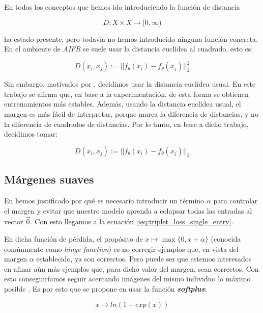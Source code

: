 En todos los conceptos que hemos ido introduciendo la función de distancia

\begin{equation}
    D: X \times X \to [0, \infty)
\end{equation}

ha estado presente, pero todavía no hemos introducido ninguna función concreta. En el ambiente de \textit{AIFR} se suele usar la distancia euclídea al cuadrado, esto es:

\begin{equation}
    D(x_i, x_j) := ||f_{\theta}(x_i) - f_{\theta}(x_j)||^2_2
\end{equation}

Sin embargo, motivados por \cite{informatica:principal}, decidimos usar la distancia euclídea usual. En este trabajo se afirma que, en base a la experimentación, de esta forma se obtienen entrenamientos más estables. Además, usando la distancia euclídea usual, el margen es más fácil de interpretar, porque marca la diferencia de distancias, y no la diferencia de cuadrados de distancias. Por lo tanto, en base a dicho trabajo, decidimos tomar:

\begin{equation}
        D(x_i, x_j) := ||f_{\theta}(x_i) - f_{\theta}(x_j)||_2
\end{equation}

\subsection{Márgenes suaves} \label{isec:margenes_suaves}

En  hemos justificado por qué es necesario introducir un término $\alpha$ para controlar el margen y evitar que nuestro modelo aprenda a colapsar todas las entradas al vector $\vec{0}$. Con esto llegamos a la ecuación \eqref{ieq:triplet_loss_single_entry}.

En dicha función de pérdida, el propósito de $x \mapsto \max\{0, x + \alpha\}$ (conocida comúnmente como \textit{hinge function}) es no corregir ejemplos que, en vista del margen $\alpha$ establecido, ya son correctos. Pero puede ser que estemos interesados en afinar aún más ejemplos que, para dicho valor del margen, sean correctos. Con esto conseguiríamos seguir acercando imágenes del mismo individuo lo máximo posible \cite{informatica:principal}. Es por esto que se propone en usar la función \textbf{\textit{softplus}}:

\begin{equation}
    x \mapsto ln(1 + exp(x))
\end{equation}

